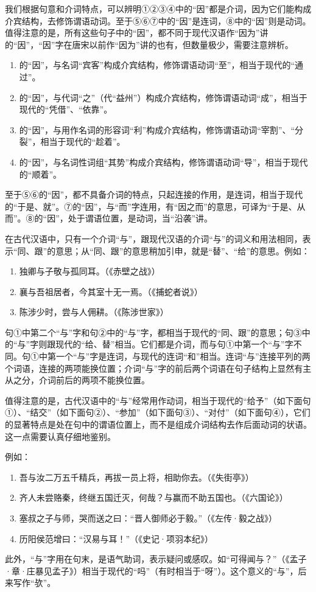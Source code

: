 我们根据句意和介词特点，可以辨明①②③④中的“因”都是介词，因为它们能构成介宾结构，去修饰谓语动词。至于⑤⑥⑦中的“因”是连词，⑧中的“因”则是动词。值得注意的是，所有这些句子中的“因”，都不同于现代汉语作“因为”讲的“因”，“因”字在唐宋以前作“因为”讲的也有，但数量极少，需要注意辨析。

\begin{enumerate}[label=\textcircled{\arabic*}]
	\item 的“因”，与名词“宾客”构成介宾结构，修饰谓语动词“至”，相当于现代的“通过”。
	\item 的“因”，与代词“之”（代“益州”）构成介宾结构，修饰谓语动词“成”，相当于现代的“凭借”、“依靠”。
	\item 的“因”，与用作名词的形容词“利”构成介宾结构，修饰谓语动词“宰割”、“分裂”，相当于现代的“趁着”。
	\item 的“因”，与名词性词组“其势”构成介宾结构，修饰谓语动词“导”，相当于现代的“顺着”。
\end{enumerate}

至于⑤⑥的“因”，都不具备介词的特点，只起连接的作用，是连词，相当于现代的“于是、就”。⑦的“因”，与“而”字连用，有“因之而”的意思，可译为“于是、从而”。⑧的“因”，处于谓语位置，是动词，当“沿袭”讲。
\newpage

在古代汉语中，只有一个介词“与”，跟现代汉语的介词“与”的词义和用法相同，表示“同、跟”的意思；从“同、跟”的意思稍加引申，就是“替”、“给”的意思。例如：

\begin{enumerate}[label=\textcircled{\arabic*}]
	\item 独卿与子敬与孤同耳。（《赤壁之战》）
	\item 襄与吾祖居者，今其室十无一焉。（《捕蛇者说》）
	\item 陈涉少时，尝与人佣耕。（《陈涉世家》）
\end{enumerate}

句①中第二个“与”字和句②中的“与”字，都相当于现代的“同、跟”的意思；句③中的“与”字则跟现代的“给、替”相当。它们都是介词，而与句①中第一个“与”字不同。句①中第一个“与”字是连词，与现代的连词“和”相当。连词“与”连接平列的两个词语，连接的两项能换位置；介词“与”字的前后两个词语在句子结构上显然有主从之分，介词前后的两项不能换位置。

值得注意的是，古代汉语中的“与”经常用作动词，相当于现代的“给予”（如下面句①）、“结交”（如下面句②）、“参加”（如下面句③）、“对付”（如下面句④），它们的显著特点是处在句中的谓语位置上，而不是组成介词结构去作后面动词的状语。这一点需要认真仔细地鉴别。

例如：
\newpage

\begin{enumerate}[label=\textcircled{\arabic*}]
	\item 吾与汝二万五千精兵，再拔一员上将，相助你去。（《失街亭》）
	\item 齐人未尝赂秦，终继五国迁灭，何哉？与赢而不助五国也。（《六国论》）
	\item 塞叔之子与师，哭而送之曰：“晋人御师必于毅。”（《左传·毅之战》）
	\item 历阳侯范增曰：“汉易与耳！”（《史记·项羽本纪》）
\end{enumerate}

此外，“与”字用在句末，是语气助词，表示疑问或感叹。如“可得闻与？”（《孟子·章·庄暴见孟子》）相当于现代的“吗”（有时相当于“呀”）。这个意义的“与”，后来写作“欤”。
\newpage